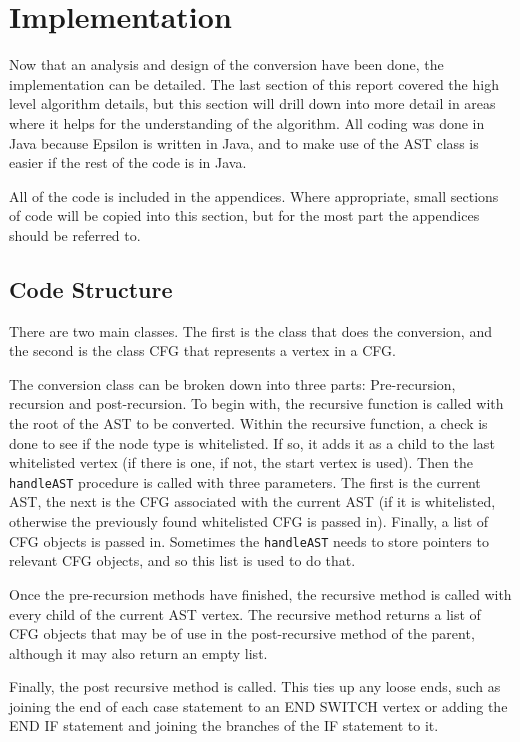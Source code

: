\section{Implementation}

Now that an analysis and design of the conversion have been done, the implementation can be detailed. The last section of this report covered the high level algorithm details, but this section will drill down into more detail in areas where it helps for the understanding of the algorithm. All coding was done in Java because Epsilon is written in Java, and to make use of the AST class is easier if the rest of the code is in Java.

All of the code is included in the appendices. Where appropriate, small sections of code will be copied into this section, but for the most part the appendices should be referred to.

\subsection{Code Structure}

There are two main classes. The first is the class that does the conversion, and the second is the class CFG that represents a vertex in a CFG.

The conversion class can be broken down into three parts: Pre-recursion, recursion and post-recursion. To begin with, the recursive function is called with the root of the AST to be converted. Within the recursive function, a check is done to see if the node type is whitelisted. If so, it adds it as a child to the last whitelisted vertex (if there is one, if not, the start vertex is used). Then the \verb|handleAST| procedure is called with three parameters. The first is the current AST, the next is the CFG associated with the current AST (if it is whitelisted, otherwise the previously found whitelisted CFG is passed in). Finally, a list of CFG objects is passed in. Sometimes the \verb|handleAST| needs to store pointers to relevant CFG objects, and so this list is used to do that.

Once the pre-recursion methods have finished, the recursive method is called with every child of the current AST vertex. The recursive method returns a list of CFG objects that may be of use in the post-recursive method of the parent, although it may also return an empty list. 

Finally, the post recursive method is called. This ties up any loose ends, such as joining the end of each case statement to an END SWITCH vertex or adding the END IF statement and joining the branches of the IF statement to it.


